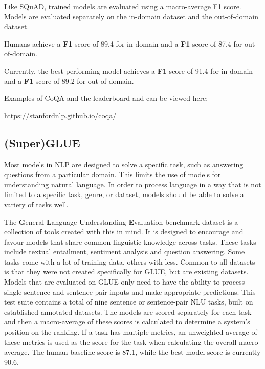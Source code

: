 \documentclass[]{krantz}
\begin{document}
Like SQuAD, trained models are evaluated using a macro-average F1 score. Models are evaluated separately on the in-domain dataset and the out-of-domain dataset. \citep{coqa2019}

Humans achieve a \textbf{F1} score of 89.4 for in-domain and a \textbf{F1} score of 87.4 for out-of-domain.

Currently, the best performing model achieves a \textbf{F1} score of 91.4 for in-domain and a \textbf{F1} score of 89.2 for out-of-domain.

Examples of CoQA and the leaderboard and can be viewed here:

\center \url{https://stanfordnlp.github.io/coqa/}

\flushleft

\hypertarget{superglue}{%
\subsection{(Super)GLUE}\label{superglue}}

Most models in NLP are designed to solve a specific task, such as answering questions from a particular domain. This limits the use of models for understanding natural language. In order to process language in a way that is not limited to a specific task, genre, or dataset, models should be able to solve a variety of tasks well.

The \textbf{G}eneral \textbf{L}anguage \textbf{U}nderstanding \textbf{E}valuation benchmark dataset is a collection of tools created with this in mind. It is designed to encourage and favour models that share common linguistic knowledge across tasks. These tasks include textual entailment, sentiment analysis and question answering. Some tasks come with a lot of training data, others with less. Common to all datasets is that they were not created specifically for GLUE, but are existing datasets. Models that are evaluated on GLUE only need to have the ability to process single-sentence and sentence-pair inputs and make appropriate predictions.
This test suite contains a total of nine sentence or sentence-pair NLU tasks, built on established annotated datasets.
The models are scored separately for each task and then a macro-average of these scores is calculated to determine a system's position on the ranking. If a task has multiple metrics, an unweighted average of these metrics is used as the score for the task when calculating the overall macro average. \citep{wang2018glue}
The human baseline score is 87.1, while the best model score is currently 90.6.
\end{document}
